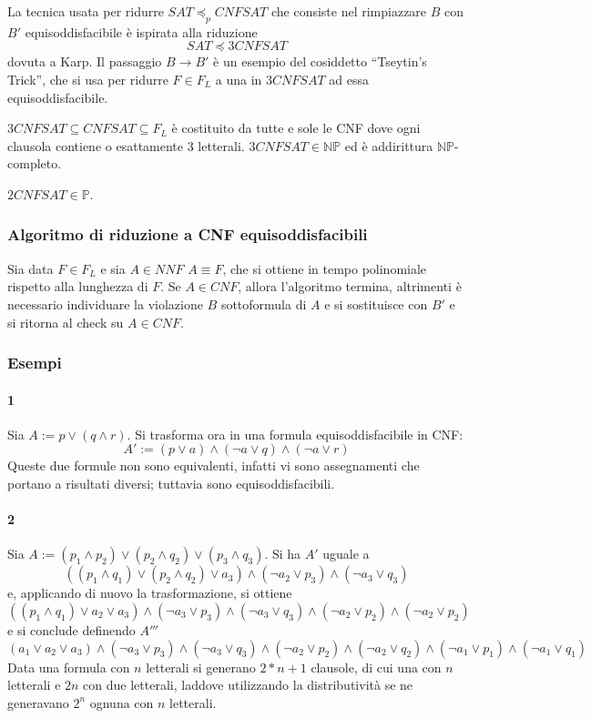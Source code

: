 La tecnica usata per ridurre $SAT \preceq_p CNFSAT$ che consiste nel rimpiazzare 
$B$ con $B'$ equisoddisfacibile è ispirata alla riduzione 
$$
SAT \preceq 3CNFSAT
$$
dovuta a Karp. Il passaggio $B \rightarrow B'$ è un esempio del cosiddetto 
``Tseytin's Trick'', che si usa per ridurre $F \in F_L$ a una 
in $3CNFSAT$ ad essa equisoddisfacibile. 

\begin{defi}
        $3CNFSAT \subseteq CNFSAT \subseteq F_L$ è costituito da tutte 
        e sole le CNF dove ogni clausola contiene o esattamente $3$ 
        letterali. $3CNFSAT \in \mathbb{NP}$ ed è addirittura $\mathbb{NP}$-completo.
\end{defi}
\begin{oss}
        $2CNFSAT \in \mathbb{P}$.
\end{oss}
\subsubsection{Algoritmo di riduzione a CNF equisoddisfacibili}
Sia data $F \in F_L$ e sia $A \in NNF$ $A \equiv F$, che si 
ottiene in tempo polinomiale rispetto alla lunghezza di $F$. 
Se $A \in CNF$, allora l'algoritmo termina, altrimenti è necessario 
individuare la violazione $B$ sottoformula di $A$ e si sostituisce con 
$B'$ e si ritorna al check su $A \in CNF$. 
\subsubsection{Esempi}
\paragraph{1} Sia $A := p \lor (q \land r)$. Si trasforma ora in una 
formula equisoddisfacibile in CNF: 
$$
A' := (p \lor a) \land (\neg a \lor q) \land (\neg a \lor r)
$$
Queste due formule non sono equivalenti, infatti vi sono assegnamenti 
che portano a risultati diversi; tuttavia sono equisoddisfacibili.

\paragraph{2} 
Sia $A := (p_1 \land p_2) \lor (p_2 \land q_2) \lor (p_3 \land q_3)$. Si 
ha $A'$ uguale a 
\[
        ((p_1 \land q_1) \lor (p_2 \land q_2) \lor a_3) \land (\neg a_2 \lor p_3) \land (\neg a_3 \lor q_3)
\]
e, applicando di nuovo la trasformazione, si ottiene 
\[
        ((p_1 \land q_1) \lor a_2 \lor a_3) \land (\neg a_3 \lor p_3) \land (\neg a_3 \lor q_3) \land (\neg a_2 \lor p_2) \land (\neg a_2 \lor p_2) 
\]
e si conclude definendo $A'''$
\[
(a_1 \lor a_2 \lor a_3) \land (\neg a_3 \lor p_3) \land (\neg a_3 \lor q_3) \land (\neg a_2 \lor p_2) \land (\neg a_2 \lor q_2) \land (\neg a_1 \lor p_1) \land (\neg a_1 \lor q_1)
\]
Data una formula con $n$ letterali si generano $2*n +1 $ clausole, 
di cui una con $n$ letterali e $2n$ con due letterali, laddove utilizzando la 
distributività se ne generavano $2^n$ ognuna con $n$ letterali. 


